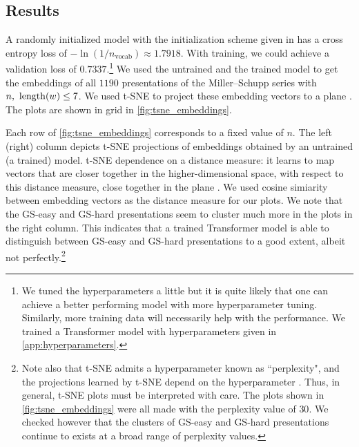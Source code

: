 \subsection{Results}\label{sec:transformer_results}

A randomly initialized model with the initialization scheme given in \cite{Radford2019LanguageMA} has a cross entropy loss of
$-\ln (1/n_{\text{vocab}}) \approx  1.7918$.
With training, we could achieve a validation loss of $0.7337$.\footnote{
We tuned the hyperparameters a little but it is quite likely that one can achieve a better performing model with more hyperparameter tuning.
Similarly, more training data will necessarily help with the performance.
We trained a Transformer model with hyperparameters given in  \autoref{app:hyperparameters}.}
We used the untrained and the trained model to get the embeddings of all $1190$ presentations of the Miller--Schupp series with $n, \ \operatorname{length}(w) \leq 7$.
We used t-SNE to project these embedding vectors to a plane \cite{JMLR:v9:vandermaaten08a}.
The plots are shown in grid in \autoref{fig:tsne_embeddings}.

Each row of \autoref{fig:tsne_embeddings} corresponds to a fixed value of $n$.
The left (right) column depicts t-SNE projections of embeddings obtained by an untrained (a trained) model.
t-SNE dependence on a distance measure: it learns to map vectors that are closer together in the higher-dimensional space, with respect to this distance measure, close together in the plane \cite{JMLR:v9:vandermaaten08a}.
We used cosine simiarity between embedding vectors as the distance measure for our plots.
We note that the GS-easy and GS-hard presentations seem to cluster much more in the plots in the right column.
This indicates that a trained Transformer model is able to distinguish between GS-easy and GS-hard presentations to a good extent, albeit not perfectly.\footnote{
Note also that t-SNE admits a hyperparameter known as ``perplexity", and the projections learned by t-SNE depend on the hyperparameter \cite{wattenberg2016how}.
Thus, in general, t-SNE plots must be interpreted with care.
The plots shown in \autoref{fig:tsne_embeddings} were all made with the perplexity value of $30$.
We checked however that the clusters of GS-easy and GS-hard presentations  continue to exists at a broad range of perplexity values.}

